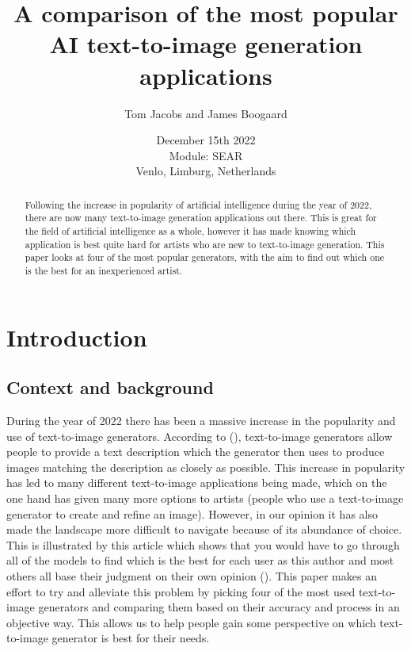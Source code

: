\documentclass[]{report}
\title{A comparison of the most popular AI text-to-image generation applications}
\author{Tom Jacobs and James Boogaard}
\date{December 15th 2022 \\Module: SEAR \\Venlo, Limburg, Netherlands}
\begin{document}
	
	\maketitle
	
	\begin{abstract}
		Following the increase in popularity of artificial intelligence during the year of 2022, there are now many text-to-image generation applications out there. This is great for the field of artificial intelligence as a whole, however it has made knowing which application is best quite hard for artists who are new to text-to-image generation. This paper looks at four of the most popular generators, with the aim to find out which one is the best for an inexperienced artist.
		
		
	\end{abstract}
	
	\tableofcontents
	\setcounter{page}{3}
	\listoffigures %
	\pagebreak
	
	
	\section{Introduction}
	
	\subsection{Context and background}
	During the year of 2022 there has been a massive increase in the popularity and use of text-to-image generators. According to \citeauthor{whatIsTextToImageGen} (\citeyear{whatIsTextToImageGen}), text-to-image generators allow people to provide a text description which the generator then uses to produce images matching the description as closely as possible. This increase in popularity has led to many different text-to-image applications being made, which on the one hand has given many more options to artists (people who use a text-to-image generator to create and refine an image). However, in our opinion it has also made the landscape more difficult to navigate because of its abundance of choice. This is illustrated by this article which shows that you would have to go through all of the models to find which is the best for each user as this author and most others all base their judgment on their own opinion (\cite{whyUseImageComp}). This paper makes an effort to try and alleviate this problem by picking four of the most used text-to-image generators and comparing them based on their accuracy and process in an objective way. This allows us to help people gain some perspective on which text-to-image generator is best for their needs.
	
\end{document}

